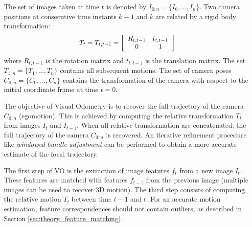 The set of images taken at time $t$ is denoted by $I_{0:n} = \{I_0, \hdots, I_n\}$.
Two camera positions at consecutive time instants $k-1$ and $k$ are related by a rigid body transformation:
\begin{equation}
\label{eq:computer-vision-visual-odometry-T}
T_t = T_{t,t-1} = 
\left[ \begin{array}{c c}
R_{t,t-1} & t_{t,t-1} \\
0 & 1
\end{array} \right]
\end{equation}
where $R_{t,t-1}$ is the rotation matrix and $t_{t,t-1}$ is the translation matrix.
The set $T_{1:n} = \{T_1, \hdots, T_n\}$ contains all subsequent motions.
The set of camera poses $C_{0:n} = \{C_0, \hdots, C_n\}$ contains the transformation of the camera with respect to the initial coordinate frame at time $t = 0$.

The objective of Visual Odometry is to recover the full trajectory of the camera $C_{0:n}$ (egomotion).
This is achieved by computing the relative transformation $T_t$ from images $I_t$ and $I_{t-1}$.
When all relative transformation are concatenated, the full trajectory of the camera $C_{0:n}$ is recovered.
An iterative refinement procedure like \textit{windowed-bundle adjustment} can be performed to obtain a more accurate estimate of the local trajectory.

The first step of VO is the extraction of image features $f_t$ from a new image $I_t$.
These features are matched with features $f_{t-1}$ from the previous image (multiple images can be used to recover 3D motion).
The third step consists of computing the relative motion $T_t$ between time $t-1$ and $t$.
For an accurate motion estimation, feature correspondences should not contain outliers, as described in Section \ref{sec:theory_feature_matching}.

